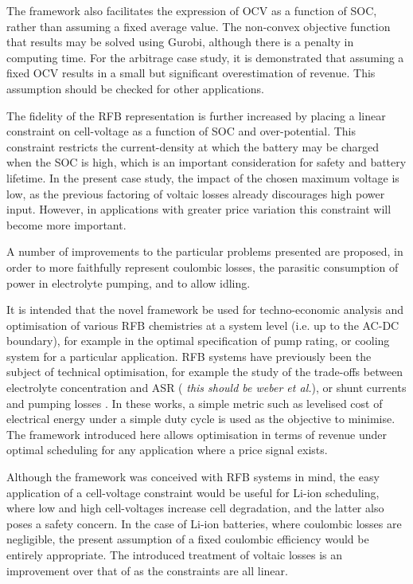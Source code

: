 \documentclass[preprint,3p,review,authoryear,10pt]{elsarticle}
\begin{document}
The framework also facilitates the expression of OCV as a function of SOC, rather than assuming a fixed average value. The non-convex objective function that results may be solved using Gurobi, although there is a penalty in computing time. For the arbitrage case study, it is demonstrated that assuming a fixed OCV results in a small but significant overestimation of revenue. This assumption should be checked for other applications.

The fidelity of the RFB representation is further increased by placing a linear constraint on cell-voltage as a function of SOC and over-potential. This constraint restricts the current-density at which the battery may be charged when the SOC is high, which is an important consideration for safety and battery lifetime. In the present case study, the impact of the chosen maximum voltage is low, as the previous factoring of voltaic losses already discourages high power input. However, in applications with greater price variation this constraint will become more important. 

A number of improvements to the particular problems presented are proposed, in order to more faithfully represent coulombic losses, the parasitic consumption of power in electrolyte pumping, and to allow idling.

It is intended that the novel framework be used for techno-economic analysis and optimisation of various RFB chemistries at a system level (i.e. up to the AC-DC boundary), for example in the optimal specification of pump rating, or cooling system for a particular application. RFB systems have previously been the subject of technical optimisation, for example the study of the trade-offs between electrolyte concentration and ASR (\cite{Weber2013} \emph{this should be weber et al.}), or shunt currents and pumping losses \citep{Viswanathan2014}. In these works, a simple metric such as levelised cost of electrical energy under a simple duty cycle is used as the objective to minimise. The framework introduced here allows optimisation in terms of revenue under optimal scheduling for any application where a price signal exists.

Although the framework was conceived with RFB systems in mind, the easy application of a cell-voltage constraint would be useful for Li-ion scheduling, where low and high cell-voltages increase cell degradation, and the latter also poses a safety concern. In the case of Li-ion batteries, where coulombic losses are negligible, the present assumption of a fixed coulombic efficiency would be entirely appropriate. The introduced treatment of voltaic losses is an improvement over that of \cite{Sarker2017} as the constraints are all linear.
\end{document}
